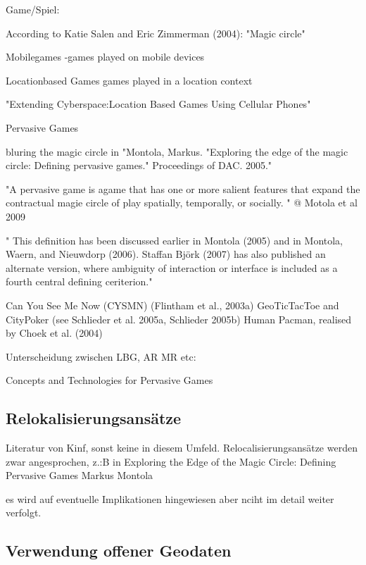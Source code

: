 Game/Spiel:

According to  Katie  Salen  and  Eric  Zimmerman  (2004):
"Magic circle"

Mobilegames
-games played on mobile devices

Locationbased Games
games played in a location context

"Extending Cyberspace:Location Based Games Using Cellular Phones"

Pervasive Games

bluring the magic circle in "Montola, Markus. "Exploring the edge of the magic circle: Defining pervasive games." Proceedings of DAC. 2005."

"A pervasive game is agame that has one or more salient features that expand the 
contractual magie circle of play spatially, temporally, or socially. " @ Motola et al 2009

" This   definition   has   been   discussed   earlier  in   Montola   (2005)   and   in   Montola,   Waern,   and 
Nieuwdorp  (2006).  Staffan  Björk  (2007)  has  also  published  an  alternate version,  where  ambiguity 
of  interaction or  interface is  included  as  a  fourth  central  defining ceriterion." 

Can You See Me Now (CYSMN) (Flintham et al., 2003a)
GeoTicTacToe and CityPoker (see Schlieder et al. 2005a, Schlieder 2005b)
Human Pacman, realised by Choek et al. (2004)

Unterscheidung zwischen LBG, AR MR etc:

Concepts and Technologies for Pervasive Games

\subsection{Relokalisierungsansätze}

Literatur von Kinf, sonst keine in diesem Umfeld.
Relocalisierungsansätze werden zwar angesprochen, z.:B in 
Exploring the Edge of the Magic Circle: 
Defining Pervasive Games 
Markus Montola 

es wird auf eventuelle Implikationen hingewiesen aber nciht im detail weiter verfolgt.

\subsection{Verwendung offener Geodaten}